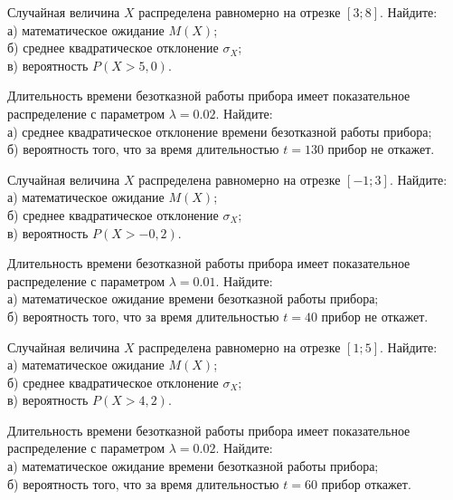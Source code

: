 \vfill

\newpage\setcounter{zad}{0}

\z Случайная величина $X$ распределена равномерно на отрезке $[3; 8]$. Найдите: \\ \quad а) математическое ожидание $M(X)$; \\ \quad б) среднее квадратическое отклонение $\sigma_X$; \\ \quad в) вероятность $P(X>5{,}0)$.


\vfill

\z Длительность времени безотказной работы прибора имеет показательное распределение с параметром $\lambda = 0.02$. Найдите: \\ \quad а) среднее квадратическое отклонение времени безотказной работы прибора; \\ \quad б) вероятность того, что за время длительностью $t = 130$ прибор не откажет.
 

\vfill

\newpage\setcounter{zad}{0}

\z Случайная величина $X$ распределена равномерно на отрезке $[-1; 3]$. Найдите: \\ \quad а) математическое ожидание $M(X)$; \\ \quad б) среднее квадратическое отклонение $\sigma_X$; \\ \quad в) вероятность $P(X>-0{,}2)$.


\vfill

\z Длительность времени безотказной работы прибора имеет показательное распределение с параметром $\lambda = 0.01$. Найдите: \\ \quad а) математическое ожидание времени безотказной работы прибора; \\ \quad б) вероятность того, что за время длительностью $t = 40$ прибор не откажет.
 

\vfill

\newpage\setcounter{zad}{0}

\z Случайная величина $X$ распределена равномерно на отрезке $[1; 5]$. Найдите: \\ \quad а) математическое ожидание $M(X)$; \\ \quad б) среднее квадратическое отклонение $\sigma_X$; \\ \quad в) вероятность $P(X>4{,}2)$.


\vfill

\z Длительность времени безотказной работы прибора имеет показательное распределение с параметром $\lambda = 0.02$. Найдите: \\ \quad а) математическое ожидание времени безотказной работы прибора; \\ \quad б) вероятность того, что за время длительностью $t = 60$ прибор откажет.
 


